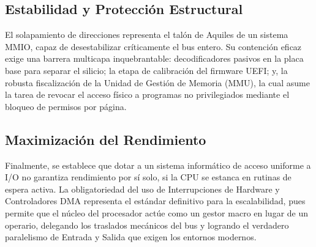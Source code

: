 \documentclass[12pt,a4paper]{article}
\begin{document}
	\subsection{Estabilidad y Protección Estructural}
	El solapamiento de direcciones representa el talón de Aquiles de un sistema MMIO, capaz de desestabilizar críticamente el bus entero. Su contención eficaz exige una barrera multicapa inquebrantable: decodificadores pasivos en la placa base para separar el silicio; la etapa de calibración del firmware UEFI; y, la robusta fiscalización de la Unidad de Gestión de Memoria (MMU), la cual asume la tarea de revocar el acceso físico a programas no privilegiados mediante el bloqueo de permisos por página.
	
	\subsection{Maximización del Rendimiento}
	Finalmente, se establece que dotar a un sistema informático de acceso uniforme a I/O no garantiza rendimiento por sí solo, si la CPU se estanca en rutinas de espera activa. La obligatoriedad del uso de Interrupciones de Hardware y Controladores DMA representa el estándar definitivo para la escalabilidad, pues permite que el núcleo del procesador actúe como un gestor macro en lugar de un operario, delegando los traslados mecánicos del bus y logrando el verdadero paralelismo de Entrada y Salida que exigen los entornos modernos.
	
\end{document}
